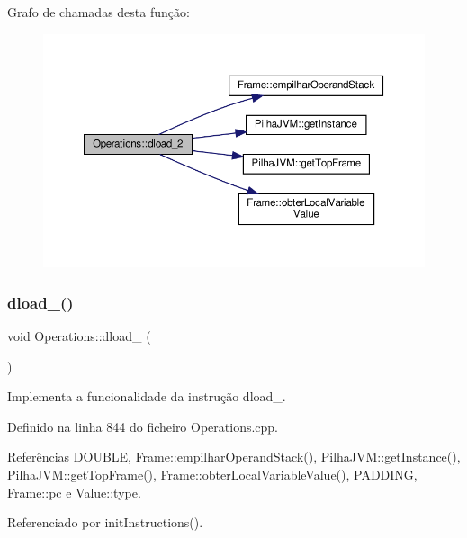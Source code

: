 Grafo de chamadas desta função\+:
\nopagebreak
\begin{figure}[H]
\begin{center}
\leavevmode
\includegraphics[width=350pt]{classOperations_a55b89c1780e7f91ad7b6da5747d8c6ba_cgraph}
\end{center}
\end{figure}
\mbox{\label{classOperations_ab3a0a107f5c4a791c71b727142a69523}} 
\subsubsection{\texorpdfstring{dload\+\_()}{dload\_3()}}
{\footnotesize\ttfamily void Operations\+::dload\+\_ (\begin{DoxyParamCaption}{ }\end{DoxyParamCaption})\hspace{0.3cm}{\ttfamily [private]}}



Implementa a funcionalidade da instrução dload\+\_. 



Definido na linha 844 do ficheiro Operations.\+cpp.



Referências D\+O\+U\+B\+LE, Frame\+::empilhar\+Operand\+Stack(), Pilha\+J\+V\+M\+::get\+Instance(), Pilha\+J\+V\+M\+::get\+Top\+Frame(), Frame\+::obter\+Local\+Variable\+Value(), P\+A\+D\+D\+I\+NG, Frame\+::pc e Value\+::type.



Referenciado por init\+Instructions().

